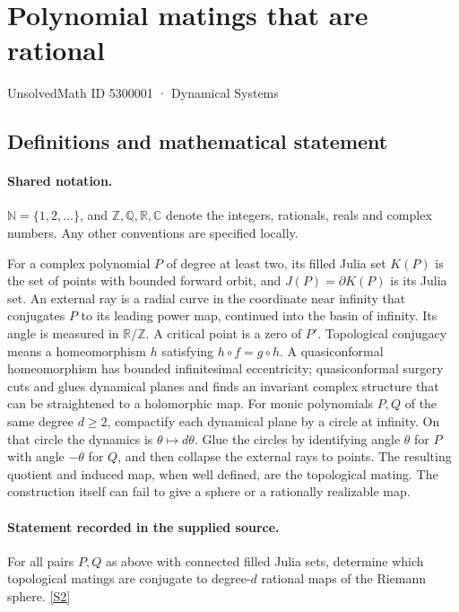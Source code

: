 \documentclass[11pt]{article}
\newcommand{\sref}[2]{\hyperlink{source:#1:#2}{[S#2]}}
\begin{document}
\setcounter{section}{5300000}
\section{Polynomial matings that are rational}\label{5300001}
{\small\sffamily UnsolvedMath ID 5300001 · Dynamical Systems}
\subsection{Definitions and mathematical statement}

\paragraph{Shared notation.}$\mathbb N=\{1,2,\ldots\}$, and $\mathbb Z,\mathbb Q,\mathbb R,\mathbb C$ denote the integers, rationals, reals and complex numbers. Any other conventions are specified locally.


For a complex polynomial $P$ of degree at least two, its filled Julia set $K(P)$ is the set of points with bounded forward orbit, and $J(P)=\partial K(P)$ is its Julia set. An external ray is a radial curve in the coordinate near infinity that conjugates $P$ to its leading power map, continued into the basin of infinity. Its angle is measured in $\mathbb R/\mathbb Z$. A critical point is a zero of $P'$. Topological conjugacy means a homeomorphism $h$ satisfying $h\circ f=g\circ h$. A quasiconformal homeomorphism has bounded infinitesimal eccentricity; quasiconformal surgery cuts and glues dynamical planes and finds an invariant complex structure that can be straightened to a holomorphic map.
For monic polynomials $P,Q$ of the same degree $d\geq2$, compactify each dynamical plane by a circle at infinity. On that circle the dynamics is $\theta\mapsto d\theta$. Glue the circles by identifying angle $\theta$ for $P$ with angle $-\theta$ for $Q$, and then collapse the external rays to points. The resulting quotient and induced map, when well defined, are the topological mating. The construction itself can fail to give a sphere or a rationally realizable map.
\paragraph{Statement recorded in the supplied source.}
For all pairs $P,Q$ as above with connected filled Julia sets, determine which topological matings are conjugate to degree-$d$ rational maps of the Riemann sphere. \sref{5300001}{2}
\end{document}
